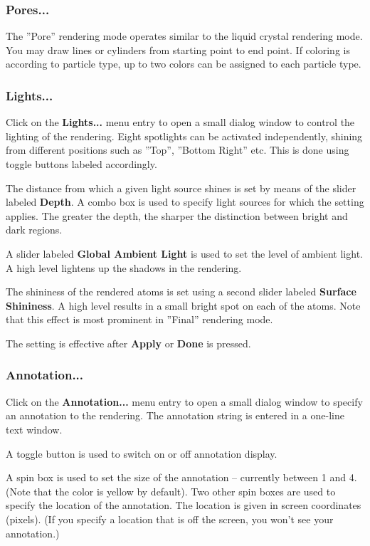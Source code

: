 \documentclass[11pt]{article}
\begin{document}
\subsubsection{Pores...}

The ''Pore'' rendering mode operates similar to the liquid crystal 
rendering mode.  You may draw lines or cylinders from starting point to 
end point.  If coloring is according to particle type, up to two colors 
can be assigned to each particle type.   

\subsubsection{Lights...}

Click on the {\bf Lights...} menu entry to open a small dialog window to
control the lighting of the rendering.   Eight spotlights can be activated
independently, shining from different positions such as ''Top'', ''Bottom
Right'' etc.  This is done using toggle buttons labeled accordingly.

The distance from which a given light source shines is set by means of the 
slider labeled {\bf Depth}.  A combo box is used to specify light sources 
for which the setting applies.  The greater the depth, the sharper the 
distinction between bright and dark regions.

A slider labeled {\bf Global Ambient Light} is used to set the level of 
ambient light.  A high level lightens up the shadows in the rendering. 

The shininess of the rendered atoms is set using a second slider labeled 
{\bf Surface Shininess}.  A high level results in a small bright spot on 
each of the atoms.  Note that this effect is most prominent in ''Final'' 
rendering mode.

The setting is effective after {\bf Apply} or {\bf Done} is pressed.

\subsubsection{Annotation...}

Click on the {\bf Annotation...} menu entry to open a small dialog window to
specify an annotation to the rendering.  The annotation string is entered in a
one-line text window.  

A toggle button is used to switch on or off annotation display.

A spin box is used to set the size of the annotation -- currently between 1 and
4.  (Note that the color is yellow by default).  Two other spin boxes are used
to specify the location of the annotation.  The location is given in screen
coordinates (pixels).  (If you specify a location that is off the screen, you
won't see your annotation.)
\end{document}
